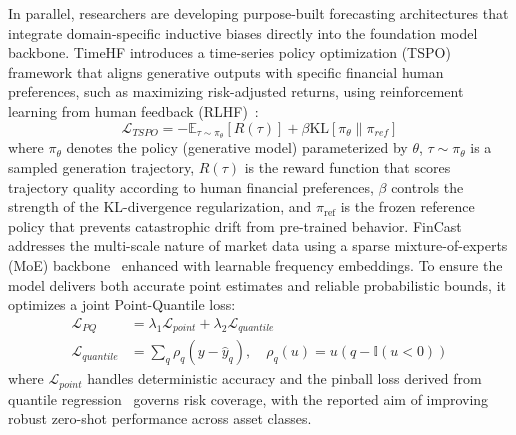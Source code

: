 In parallel, researchers are developing purpose-built forecasting architectures that integrate domain-specific inductive biases directly into the foundation model backbone. TimeHF \citep{qi2025timehf} introduces a time-series policy optimization (TSPO) framework that aligns generative outputs with specific financial human preferences, such as maximizing risk-adjusted returns, using reinforcement learning from human feedback (RLHF)~\citep{christiano2017deep,ouyang2022training}:
\begin{equation}
\mathcal{L}_{TSPO} = -\mathbb{E}_{\tau \sim \pi_\theta}[R(\tau)] + \beta \text{KL}[\pi_\theta \| \pi_{ref}]
\end{equation}
where $\pi_\theta$ denotes the policy (generative model) parameterized by $\theta$, $\tau \sim \pi_\theta$ is a sampled generation trajectory, $R(\tau)$ is the reward function that scores trajectory quality according to human financial preferences, $\beta$ controls the strength of the KL-divergence regularization, and $\pi_{\text{ref}}$ is the frozen reference policy that prevents catastrophic drift from pre-trained behavior.
FinCast \citep{zhu2025fincast} addresses the multi-scale nature of market data using a sparse mixture-of-experts (MoE) backbone~\citep{shazeer2017outrageously,fedus2022switch} enhanced with learnable frequency embeddings. To ensure the model delivers both accurate point estimates and reliable probabilistic bounds, it optimizes a joint Point-Quantile loss:
\begin{align}
\mathcal{L}_{PQ} &= \lambda_1 \mathcal{L}_{point} + \lambda_2 \mathcal{L}_{quantile} \\
\mathcal{L}_{quantile} &= \sum_q \rho_q(y - \hat{y}_q), \quad \rho_q(u) = u(q - \mathbb{I}(u < 0))
\end{align}
where $\mathcal{L}_{point}$ handles deterministic accuracy and the pinball loss derived from quantile regression~\citep{koenker1978regression} governs risk coverage, with the reported aim of improving robust zero-shot performance across asset classes.

